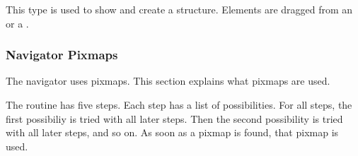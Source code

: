 This \NAVIGATOR{} type is used to show and create a structure. Elements are
dragged from an \ICONVIEW{} or a \NAVIGATOR{}.


\newpage
\subsubsection{Navigator Pixmaps}
\label{sec:uinavigatorPixmaps}
The navigator uses pixmaps. This section explains what pixmaps are used.

The routine has five steps. Each step has a list of possibilities. For all steps, the first possibiliy is tried
with all later steps. Then the second possibility is tried with all later steps, and so on.
As soon as a pixmap is found, that pixmap is used.

